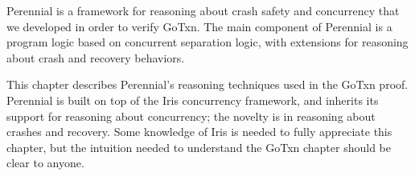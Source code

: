 Perennial is a framework for reasoning about crash safety and concurrency that
we developed in order to verify GoTxn. The main component of Perennial is a
program logic based on concurrent separation logic, with extensions for
reasoning about crash and recovery behaviors.

This chapter describes Perennial's reasoning techniques used in the GoTxn proof.
Perennial is built on top of the Iris concurrency framework, and inherits its
support for reasoning about concurrency; the novelty is in reasoning about
crashes and recovery. Some knowledge of Iris is needed to fully appreciate this
chapter, but the intuition needed to understand the GoTxn chapter should be
clear to anyone.



